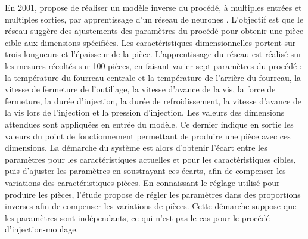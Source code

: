 En 2001, \citeauthor{lau_neural_2001} propose de réaliser un modèle inverse du procédé, à multiples entrées et multiples sorties, par apprentissage d'un réseau de neurones \cite{lau_neural_2001}. %
L’objectif est que le réseau suggère des ajustements des paramètres du procédé pour obtenir une pièce cible aux dimensions spécifiées.
Les caractéristiques dimensionnelles portent sur trois longueurs et l'épaisseur de la pièce.
L'apprentissage du réseau est réalisé sur les mesures récoltés sur 100 pièces, en faisant varier sept paramètres du procédé : la température du fourreau centrale et la température de l'arrière du fourreau, la vitesse de fermeture de l’outillage, la vitesse d’avance de la vis, la force de fermeture, la durée d'injection, la durée de refroidissement, la vitesse d'avance de la vis lors de l'injection et la pression d'injection.
Les valeurs des dimensions attendues sont appliquées en entrée du modèle.
Ce dernier indique en sortie les valeurs du point de fonctionnement permettant de produire une pièce avec ces dimensions.
La démarche du système est alors d'obtenir l'écart entre les paramètres pour les caractéristiques actuelles et pour les caractéristiques cibles, puis d'ajuster les paramètres en soustrayant ces écarts, afin de compenser les variations des caractéristiques pièces.
En connaissant le réglage utilisé pour produire les pièces, l'étude propose de régler les paramètres dans des proportions inverses afin de compenser les variations de pièces.
Cette démarche suppose que les paramètres sont indépendants, ce qui n'est pas le cas pour le procédé d'injection-moulage.

